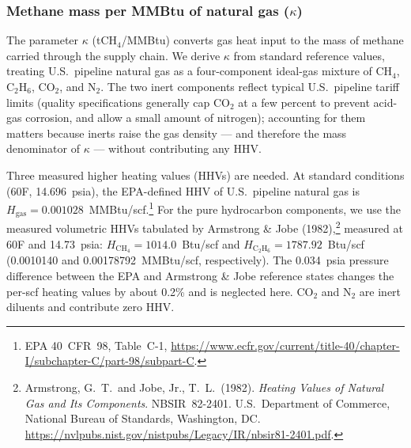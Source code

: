 \documentclass[11pt]{article}
\newcommand{\cotwo}{\ensuremath{\mathrm{CO_2}}}
\newcommand{\chfour}{\ensuremath{\mathrm{CH_4}}}
\begin{document}
\subsubsection{Methane mass per MMBtu of natural gas ($\kappa$)}
\label{sec:kappa}

The parameter $\kappa$ (t\chfour{}/MMBtu) converts gas heat input to the mass of methane carried through the supply chain. We derive $\kappa$ from standard reference values, treating U.S.\ pipeline natural gas as a four-component ideal-gas mixture of \chfour{}, C$_2$H$_6$, \cotwo{}, and N$_2$. The two inert components reflect typical U.S.\ pipeline tariff limits (quality specifications generally cap \cotwo{} at a few percent to prevent acid-gas corrosion, and allow a small amount of nitrogen); accounting for them matters because inerts raise the gas density --- and therefore the mass denominator of $\kappa$ --- without contributing any HHV.

Three measured higher heating values (HHVs) are needed. At standard conditions (60\textdegree F, 14.696~psia), the EPA-defined HHV of U.S.\ pipeline natural gas is $H_{\text{gas}} = 0.001028$~MMBtu/scf.\footnote{EPA 40~CFR~98, Table~C-1, \url{https://www.ecfr.gov/current/title-40/chapter-I/subchapter-C/part-98/subpart-C}.} For the pure hydrocarbon components, we use the measured volumetric HHVs tabulated by Armstrong \& Jobe (1982),\footnote{Armstrong, G.~T.\ and Jobe, Jr., T.~L.\ (1982). \emph{Heating Values of Natural Gas and Its Components}. NBSIR~82-2401. U.S.\ Department of Commerce, National Bureau of Standards, Washington, DC. \url{https://nvlpubs.nist.gov/nistpubs/Legacy/IR/nbsir81-2401.pdf}.} measured at 60\textdegree F and 14.73~psia: $H_{\chfour} = 1014.0$~Btu/scf and $H_{\text{C}_2\text{H}_6} = 1787.92$~Btu/scf (0.0010140 and 0.00178792~MMBtu/scf, respectively). The 0.034~psia pressure difference between the EPA and Armstrong \& Jobe reference states changes the per-scf heating values by about 0.2\% and is neglected here. \cotwo{} and N$_2$ are inert diluents and contribute zero HHV.
\end{document}
